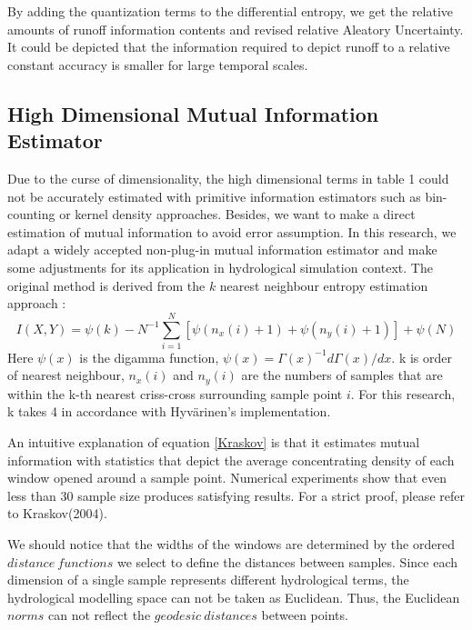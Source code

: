 \documentclass[draft,wrr]{AGUTeX}
\begin{document}
\begin{article}
By adding the quantization terms to the differential entropy, we get the relative amounts of runoff information contents and revised relative Aleatory Uncertainty. It could be depicted that the information required to depict runoff to a relative constant accuracy is smaller for large temporal scales.
\fi


\subsection{High Dimensional Mutual Information Estimator}
Due to the curse of dimensionality, the high dimensional terms in table 1 could not be accurately estimated with primitive information estimators such as bin-counting or kernel density approaches. Besides, we want to make a direct estimation of mutual information to avoid  error assumption. In this research, we adapt a widely accepted non-plug-in mutual information estimator and make some adjustments for its application in hydrological simulation context. The original method is derived from the $k$ nearest neighbour entropy estimation approach \citep{kraskov2004estimating}:
\begin{equation}\label{Kraskov}
I(X,Y)=\psi(k)-N^{-1}\sum_{i=1}^{N}[\psi(n_x(i)+1)+\psi(n_y(i)+1)]+\psi(N)
\end{equation}
Here $\psi(x)$ is the digamma function, $\psi(x)=\Gamma(x)^{-1}d\Gamma(x)/dx$. k is order of nearest neighbour, $n_x(i)$ and $n_y(i)$ are the numbers of samples that are within the k-th nearest  criss-cross surrounding sample point $i$. For this research, k takes 4 in accordance with Hyv{\"a}rinen's implementation.

An intuitive explanation of equation \eqref{Kraskov} is that it estimates mutual information with statistics that depict the average concentrating density of each window opened around a sample point. Numerical experiments show that even less than 30 sample size produces satisfying results. For a strict proof, please refer to Kraskov(2004).

We should notice that the widths of the windows are determined by the ordered $distance~functions$ we select to define the distances between samples. Since each dimension of a single sample represents different hydrological terms, the hydrological modelling space can not be taken as Euclidean. Thus, the Euclidean $norms$ can not reflect the $geodesic      ~distances$ between points. 
 

\end{article}
\end{document}
